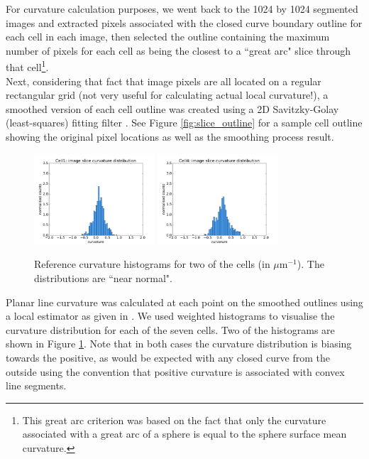 \documentclass[a4paper,10pt]{article}
\begin{document}
For curvature calculation purposes, we went back to the 1024 by 1024 segmented images and extracted pixels associated with the closed curve boundary outline for each cell in each  image, then selected the outline containing the maximum number of pixels for each cell as being the closest to a ``great arc" slice through that cell\footnote{This great arc criterion was based on the fact that only the curvature associated with a great arc of a sphere is equal to the sphere surface mean curvature.}.\\

Next, considering that fact that image pixels are all located on a regular rectangular grid (not very useful for calculating actual local curvature!), a smoothed version of each cell outline was created using a 2D Savitzky-Golay (least-squares) fitting filter \cite{doi:10.1021/ac60214a047}. See Figure \ref{fig:slice_outline} for a sample cell outline showing the original pixel locations as well as the smoothing process result.\\

\begin{figure}[H]
\begin{center}
\includegraphics[width=0.4\textwidth]{images/cell1_curv.pdf}
\includegraphics[width=0.4\textwidth]{images/cell4_curv.pdf}
\end{center}
\caption{Reference curvature histograms for two of the cells (in $\mu \text{m}^{-1}$). The distributions are ``near normal".}
\label{fig:ref_histogram}
\end{figure}

Planar line curvature was calculated at each point on the smoothed outlines using a local estimator as given in \cite{Rugis_2008_DSC}. We used weighted histograms to visualise the curvature distribution for each of the seven cells. Two of the histograms are shown in Figure \ref{fig:ref_histogram}. Note that in both cases the curvature distribution is biasing towards the positive, as would be expected with any closed curve from the outside using the convention that positive curvature is associated with convex line segments.\\
\end{document}
